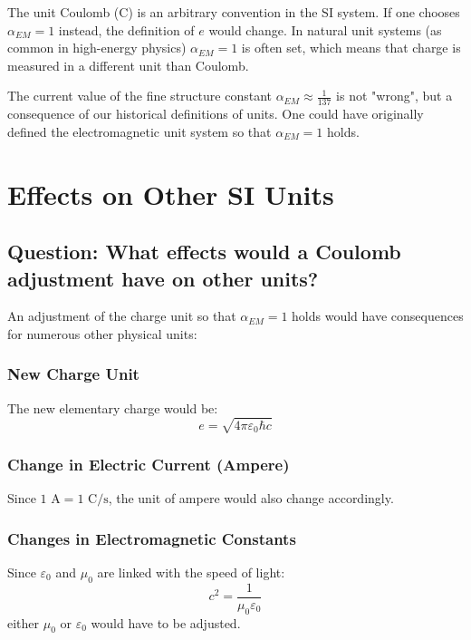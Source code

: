 \documentclass[12pt,a4paper]{article}
\begin{document}
	The unit Coulomb (C) is an arbitrary convention in the SI system. If one chooses $\alpha_{EM} = 1$ instead, the definition of $e$ would change. In natural unit systems (as common in high-energy physics) $\alpha_{EM} = 1$ is often set, which means that charge is measured in a different unit than Coulomb.
	
	The current value of the fine structure constant $\alpha_{EM} \approx \frac{1}{137}$ is not "wrong", but a consequence of our historical definitions of units. One could have originally defined the electromagnetic unit system so that $\alpha_{EM} = 1$ holds.
	
	\section{Effects on Other SI Units}
	
	\subsection{Question: What effects would a Coulomb adjustment have on other units?}
	
	An adjustment of the charge unit so that $\alpha_{EM} = 1$ holds would have consequences for numerous other physical units:
	
	\subsubsection{New Charge Unit}
	The new elementary charge would be:
	\begin{equation}
		e = \sqrt{4\pi\varepsilon_0\hbar c}
	\end{equation}
	
	\subsubsection{Change in Electric Current (Ampere)}
	Since $1 \text{ A} = 1 \text{ C}/\text{s}$, the unit of ampere would also change accordingly.
	
	\subsubsection{Changes in Electromagnetic Constants}
	Since $\varepsilon_0$ and $\mu_0$ are linked with the speed of light:
	\begin{equation}
		c^2 = \frac{1}{\mu_0\varepsilon_0}
	\end{equation}
	either $\mu_0$ or $\varepsilon_0$ would have to be adjusted.
	
\end{document}
